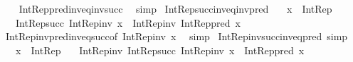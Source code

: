 \begin{isabellebody}
%
\isadelimproof
\ \ %
\endisadelimproof
%
\isatagproof
{}\isamarkupfalse%
\ Int{\isacharunderscore}{\kern0pt}Rep{\isacharunderscore}{\kern0pt}pred{\isacharunderscore}{\kern0pt}inv{\isacharunderscore}{\kern0pt}eq{\isacharunderscore}{\kern0pt}inv{\isacharunderscore}{\kern0pt}succ\ \isamarkupfalse%
\ simp%
\endisatagproof
{\isafoldproof}%
%
\isadelimproof
\isanewline
%
\endisadelimproof
\isanewline
{}\isamarkupfalse%
\ Int{\isacharunderscore}{\kern0pt}Rep{\isacharunderscore}{\kern0pt}succ{\isacharunderscore}{\kern0pt}inv{\isacharunderscore}{\kern0pt}eq{\isacharunderscore}{\kern0pt}inv{\isacharunderscore}{\kern0pt}pred{\isacharcolon}{\kern0pt}\isanewline
\ \ \ {\isachardoublequoteopen}x\ {\isacharcolon}{\kern0pt}\ Int{\isacharunderscore}{\kern0pt}Rep{\isachardoublequoteclose}\isanewline
\ \ \ {\isachardoublequoteopen}Int{\isacharunderscore}{\kern0pt}Rep{\isacharunderscore}{\kern0pt}succ\ {\isacharparenleft}{\kern0pt}Int{\isacharunderscore}{\kern0pt}Rep{\isacharunderscore}{\kern0pt}inv\ x{\isacharparenright}{\kern0pt}\ {\isacharequal}{\kern0pt}\ Int{\isacharunderscore}{\kern0pt}Rep{\isacharunderscore}{\kern0pt}inv\ {\isacharparenleft}{\kern0pt}Int{\isacharunderscore}{\kern0pt}Rep{\isacharunderscore}{\kern0pt}pred\ x{\isacharparenright}{\kern0pt}{\isachardoublequoteclose}\isanewline
%
\isadelimproof
\ \ %
\endisadelimproof
%
\isatagproof
{}\isamarkupfalse%
\ Int{\isacharunderscore}{\kern0pt}Rep{\isacharunderscore}{\kern0pt}inv{\isacharunderscore}{\kern0pt}pred{\isacharunderscore}{\kern0pt}inv{\isacharunderscore}{\kern0pt}eq{\isacharunderscore}{\kern0pt}succ{\isacharbrackleft}{\kern0pt}of\ {\isachardoublequoteopen}Int{\isacharunderscore}{\kern0pt}Rep{\isacharunderscore}{\kern0pt}inv\ x{\isachardoublequoteclose}{\isacharbrackright}{\kern0pt}\ \isamarkupfalse%
\ simp%
\endisatagproof
{\isafoldproof}%
%
\isadelimproof
\isanewline
%
\endisadelimproof
\isanewline
{}\isamarkupfalse%
\ Int{\isacharunderscore}{\kern0pt}Rep{\isacharunderscore}{\kern0pt}inv{\isacharunderscore}{\kern0pt}succ{\isacharunderscore}{\kern0pt}inv{\isacharunderscore}{\kern0pt}eq{\isacharunderscore}{\kern0pt}pred\ {\isacharbrackleft}{\kern0pt}simp{\isacharbrackright}{\kern0pt}{\isacharcolon}{\kern0pt}\isanewline
\ \ \ {\isachardoublequoteopen}x\ {\isacharcolon}{\kern0pt}\ Int{\isacharunderscore}{\kern0pt}Rep{\isachardoublequoteclose}\isanewline
\ \ \ {\isachardoublequoteopen}Int{\isacharunderscore}{\kern0pt}Rep{\isacharunderscore}{\kern0pt}inv\ {\isacharparenleft}{\kern0pt}Int{\isacharunderscore}{\kern0pt}Rep{\isacharunderscore}{\kern0pt}succ\ {\isacharparenleft}{\kern0pt}Int{\isacharunderscore}{\kern0pt}Rep{\isacharunderscore}{\kern0pt}inv\ x{\isacharparenright}{\kern0pt}{\isacharparenright}{\kern0pt}\ {\isacharequal}{\kern0pt}\ Int{\isacharunderscore}{\kern0pt}Rep{\isacharunderscore}{\kern0pt}pred\ x{\isachardoublequoteclose}\isanewline

\end{isabellebody}
